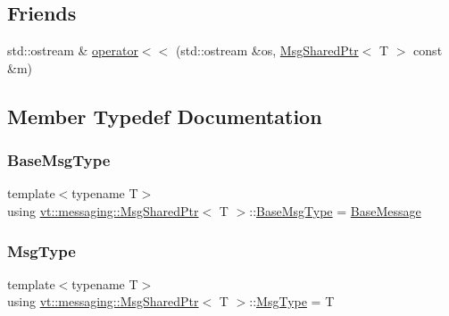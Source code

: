 \subsection*{Friends}
\begin{DoxyCompactItemize}
\item 
std\+::ostream \& \hyperlink{structvt_1_1messaging_1_1_msg_shared_ptr_ac412f09ec806f5915ea4a94f3e84d5f4}{operator$<$$<$} (std\+::ostream \&os, \hyperlink{structvt_1_1messaging_1_1_msg_shared_ptr}{Msg\+Shared\+Ptr}$<$ T $>$ const \&m)
\end{DoxyCompactItemize}


\subsection{Member Typedef Documentation}
\mbox{\label{structvt_1_1messaging_1_1_msg_shared_ptr_a778cb9ec8919e4a309d28ed345ac318d}} 
\subsubsection{\texorpdfstring{Base\+Msg\+Type}{BaseMsgType}}
{\footnotesize\ttfamily template$<$typename T$>$ \\
using \hyperlink{structvt_1_1messaging_1_1_msg_shared_ptr}{vt\+::messaging\+::\+Msg\+Shared\+Ptr}$<$ T $>$\+::\hyperlink{structvt_1_1messaging_1_1_msg_shared_ptr_a778cb9ec8919e4a309d28ed345ac318d}{Base\+Msg\+Type} =  \hyperlink{namespacevt_ac34f95a5e2b8109b55bfba52b074443d}{Base\+Message}}

\mbox{\label{structvt_1_1messaging_1_1_msg_shared_ptr_a714463f633ada883b4fbdfd3541d30a7}} 
\subsubsection{\texorpdfstring{Msg\+Type}{MsgType}}
{\footnotesize\ttfamily template$<$typename T$>$ \\
using \hyperlink{structvt_1_1messaging_1_1_msg_shared_ptr}{vt\+::messaging\+::\+Msg\+Shared\+Ptr}$<$ T $>$\+::\hyperlink{structvt_1_1messaging_1_1_msg_shared_ptr_a714463f633ada883b4fbdfd3541d30a7}{Msg\+Type} =  T}



